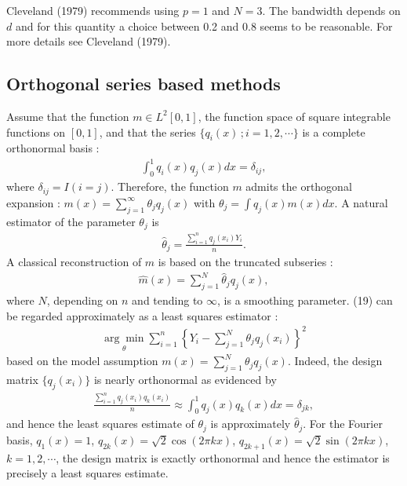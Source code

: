 \documentclass[12pt]{article}
\renewcommand{\=}[1]{\stackrel{#1}{=}} %
\theoremstyle{definition}
\begin{document}
	Cleveland (1979) recommends using $p=1$ and $N=3$. The bandwidth depends on $d$ and for this quantity a choice between 0.2 and 0.8 seems to be reasonable. For more details see Cleveland (1979).

\subsection{Orthogonal series based methods}
	Assume that the function $m\in L^2[0,1]$, the function space of square integrable functions on $[0,1]$, and that the series $\{q_i(x)\,;i=1,2,\cdots\}$ is a complete orthonormal basis :
	\begin{align}
	\int_{0}^{1}q_i(x)q_j(x)dx=\delta_{ij},
	\end{align}
	where $\delta_{ij}=I(i=j)$. Therefore, the function $m$ admits the orthogonal expansion : $m(x)=\sum_{j=1}^\infty\theta_jq_j(x)$ with $\theta_j=\int q_j(x)m(x)dx$. A natural estimator of the parameter $\theta_j$ is
	\begin{align}
	\hat{\theta}_j=\frac{\sum_{i=1}^nq_j(x_i)Y_i}{n}.
	\end{align}
	A classical reconstruction of $m$ is based on the truncated subseries :
	\begin{align}
	\hat{m}(x)=\sum_{j=1}^N\hat{\theta}_jq_j(x),
	\end{align}
	where $N$, depending on $n$ and tending to $\infty$, is a smoothing parameter. (19) can be regarded approximately as a least squares estimator :
	\begin{align}
	\underset{\theta}{\arg\min}\sum_{i=1}^n\left\{Y_i-\sum_{j=1}^N\theta_jq_j(x_i)\right\}^2
	\end{align}
	based on the model assumption $m(x)=\sum_{j=1}^N\theta_jq_j(x)$. Indeed, the design matrix $\{q_j(x_i)\}$ is nearly orthonormal as evidenced by
	\begin{align}
	\frac{\sum_{i=1}^nq_j(x_i)q_k(x_i)}{n}\approx\int_{0}^{1}q_j(x)q_k(x)dx=\delta_{jk},
	\end{align}
	and hence the least squares estimate of $\theta_j$ is approximately $\hat{\theta}_j$. For the Fourier basis, $q_1(x)=1$, $q_{2k}(x)=\sqrt{2}\cos(2\pi kx)$, $q_{2k+1}(x)=\sqrt{2}\sin(2\pi kx)$, $k=1,2,\cdots$, the design matrix is exactly orthonormal and hence the estimator is precisely a least squares estimate.
\end{document}
